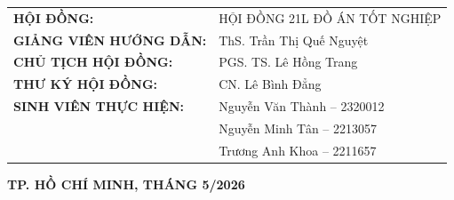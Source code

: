 \documentclass[a4paper,12pt]{extarticle}
\theoremstyle{definition}
\begin{document}
\begin{titlepage}
	\begin{center}
		\begin{tabular}{l l}
			\textbf{HỘI ĐỒNG:} & HỘI ĐỒNG 21L ĐỒ ÁN TỐT NGHIỆP  \\[0.1cm]
			\textbf{GIẢNG VIÊN HƯỚNG DẪN:} & ThS. Trần Thị Quế Nguyệt \\[0.1cm]
			\textbf{CHỦ TỊCH HỘI ĐỒNG:} & PGS. TS. Lê Hồng Trang \\[0.1cm]
			\textbf{THƯ KÝ HỘI ĐỒNG:} & CN. Lê Bình Đẳng \\[0.6cm]
			\textbf{SINH VIÊN THỰC HIỆN:} & Nguyễn Văn Thành -- 2320012 \\[0.2cm]
			& Nguyễn Minh Tân -- 2213057 \\[0.2cm]
			& Trương Anh Khoa -- 2211657
		\end{tabular}
	\end{center}
	
	\vspace{0.2cm}
	
	\begin{center}
		{\fontsize{13}{15}\selectfont \textbf{TP. HỒ CHÍ MINH, THÁNG 5/2026}}
	\end{center}
	
\end{titlepage}


\newpage

\newpage


\newpage
\tableofcontents

\newpage


\newpage


\newpage


\newpage

 
\newpage

 
 \newpage


\newpage


\newpage


\newpage

\end{document}
